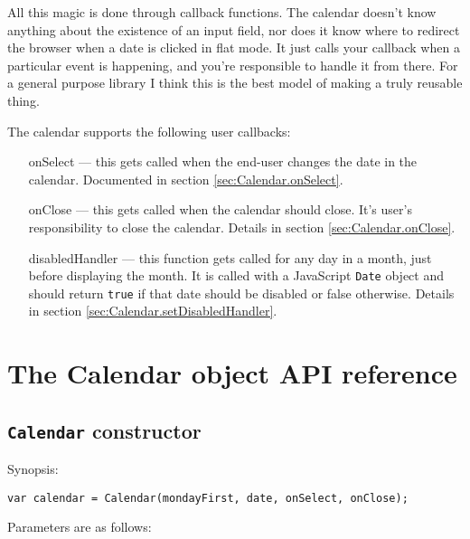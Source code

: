 \documentclass[a4paper,10pt]{article}
\begin{document}
All this magic is done through callback functions.  The calendar doesn't know
anything about the existence of an input field, nor does it know where to
redirect the browser when a date is clicked in flat mode.  It just calls your
callback when a particular event is happening, and you're responsible to handle
it from there.  For a general purpose library I think this is the best model of
making a truly reusable thing.

The calendar supports the following user callbacks:

\begin{itemize}

\item [onSelect] --- this gets called when the end-user changes the date in the
calendar.  Documented in section \ref{sec:Calendar.onSelect}.

\item [onClose] --- this gets called when the calendar should close.  It's
user's responsibility to close the calendar.  Details in section
\ref{sec:Calendar.onClose}.

\item [disabledHandler] --- this function gets called for any day in a month,
just before displaying the month.  It is called with a JavaScript \texttt{Date}
object and should return \texttt{true} if that date should be disabled
or false otherwise.  Details in section \ref{sec:Calendar.setDisabledHandler}.

\end{itemize}






\section{The Calendar object API reference}\label{sec:Calendar_reference}

\subsection{\texttt{Calendar} constructor}\label{sec:Calendar.constructor}

\noindent Synopsis:

\begin{verbatim}
var calendar = Calendar(mondayFirst, date, onSelect, onClose);
\end{verbatim}

Parameters are as follows:
\end{document}
